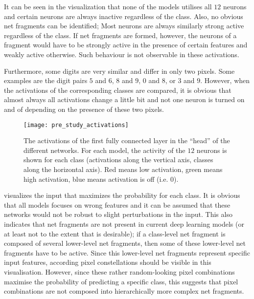 It can be seen in the visualization that none of the models utilises all $12$ neurons and certain neurons are always inactive regardless of the class.
Also, no obvious net fragments can be identified;
Most neurons are always similarly strong active regardless of the class.
If net fragments are formed, however, the neurons of a fragment would have to be strongly active in the presence of certain features and weakly active otherwise.
Such behaviour is not observable in these activations.

Furthermore, some digits are very similar and differ in only two pixels.
Some examples are the digit pairs $5$ and $6$, $8$ and $9$, $0$ and $8$, or $3$ and $9$.
However, when the activations of the corresponding classes are compared, it is obvious that almost always all activations change a little bit and not one neuron is turned on and of depending on the presence of these two pixels.

\begin{figure}[h]
    \centering
    \texttt{[image: pre\_study\_activations]}
    \caption[Network Activations for Straight Line Digits Dataset]{The activations of the first fully connected layer in the ``head'' of the different networks. For each model, the activity of the $12$ neurons is shown for each class (activations along the vertical axis, classes along the horizontal axis). Red means low activation, green means high activation, blue means activation is off (i.e. $0$).}
\end{figure}


 visualizes the input that maximizes the probability for each class.
It is obvious that all models focuses on wrong features and it can be assumed that these networks would not be robust to slight perturbations in the input.
This also indicates that net fragments are not present in current deep learning models (or at least not to the extent that is desirable);
if a class-level net fragment is composed of several lower-level net fragments, then some of these lower-level net fragments have to be active.
Since this lower-level net fragments represent specific input features, according pixel constellations should be visible in this visualisation.
However, since these rather random-looking pixel combinations maximise the probability of predicting a specific class, this suggests that pixel combinations are not composed into hierarchically more complex net fragments.

